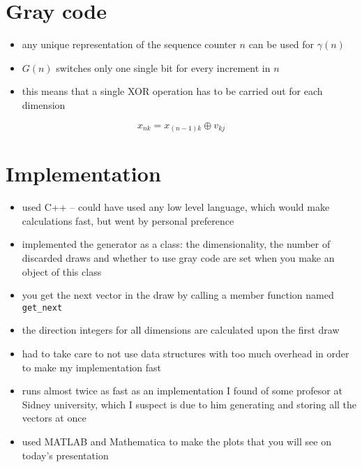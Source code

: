 \documentclass[11pt]{article}
\begin{document}
\section{Gray code}
\begin{itemize}
    \item any unique representation of the sequence counter $n$ can be used for $\gamma(n)$
    \item $G(n)$ switches only one single bit for every increment in $n$
    \item this means that a single XOR operation has to be carried out for each dimension 
\end{itemize}
\[ x_{nk} = x_{(n-1)k} \oplus v_{kj} \]

\section{Implementation}
\begin{itemize}
    \item used C++ -- could have used any low level language, which would make calculations fast, but went by personal preference
    \item implemented the generator as a class: the dimensionality, the number of discarded draws and whether to use gray code are set when you make an object of this class
    \item you get the next vector in the draw by calling a member function named \texttt{get\_next}
    \item the direction integers for all dimensions are calculated upon the first draw
    \item had to take care to not use data structures with too much overhead in order to make my implementation fast
    \item runs almost twice as fast as an implementation I found of some profesor at Sidney university, which I suspect is due to him generating and storing all the vectors at once
    
    \item used MATLAB and Mathematica to make the plots that you will see on today's presentation
\end{itemize}
\end{document}
